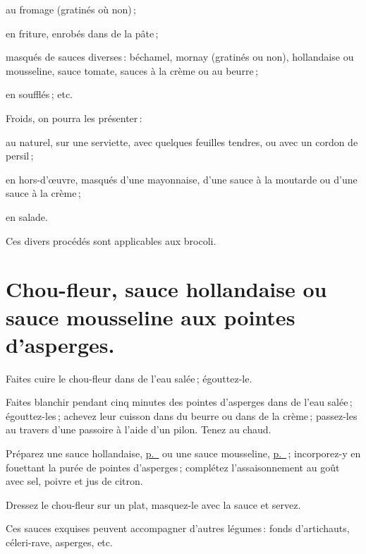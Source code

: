 au fromage (gratinés où non) ;

en friture, enrobés dans de la pâte ;

masqués de sauces diverses : béchamel, mornay (gratinés ou non), hollandaise
ou mousseline, sauce tomate, sauces à la crème ou au beurre ;

en soufflés ; etc.

Froids, on pourra les présenter :

au naturel, sur une serviette, avec quelques feuilles tendres, ou avec un
cordon de persil ;

en hors-d'œuvre, masqués d'une mayonnaise, d'une sauce à la moutarde ou
d'une sauce à la crème ;

en salade.

\sk

Ces divers procédés sont applicables aux brocoli.

\section*{\centering Chou-fleur, sauce hollandaise ou sauce mousseline aux pointes d'asperges.}
{}

Faites cuire le chou-fleur dans de l'eau salée ; égouttez-le.

Faites blanchir pendant cinq minutes des pointes d'asperges dans de l'eau
salée ; égouttez-les ; achevez leur cuisson dans du beurre ou dans de la
crème ; passez-les au travers d'une passoire à l'aide d'un pilon. Tenez au
chaud.

Préparez une sauce hollandaise, \hyperlink{p0362}{p. \pageref{pg0362}} ou une
sauce mousseline, \hyperlink{p0759}{p. \pageref{pg0759}} ; incorporez-y en
fouettant la purée de pointes d'asperges ; complétez l'assaisonnement au goût
avec sel, poivre et jus de citron.

Dressez le chou-fleur sur un plat, masquez-le avec la sauce et servez.

\sk

Ces sauces exquises peuvent accompagner d'autres légumes : fonds d'artichauts,
céleri-rave, asperges, etc.

